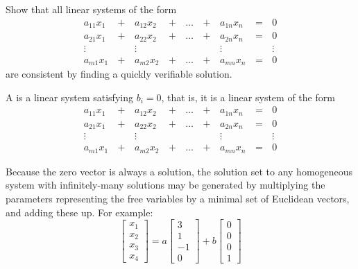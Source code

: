 \begin{applicationActivities}{3}{5}
\begin{activity}{5}
  Show that all linear systems of the form
  \begin{alignat*}{5}
    a_{11}x_1 &\,+\,& a_{12}x_2 &\,+\,& \dots  &\,+\,& a_{1n}x_n &\,=\,& 0 \\
    a_{21}x_1 &\,+\,& a_{22}x_2 &\,+\,& \dots  &\,+\,& a_{2n}x_n &\,=\,& 0 \\
     \vdots&  &\vdots&   &&  &\vdots&&\vdots  \\
    a_{m1}x_1 &\,+\,& a_{m2}x_2 &\,+\,& \dots  &\,+\,& a_{mn}x_n &\,=\,& 0
  \end{alignat*}
  are consistent by finding a
  quickly verifiable solution.
\end{activity}

\begin{definition}
  A  is a linear system satisfying \(b_i=0\), that is,
  it is a linear system of the form
  \begin{alignat*}{5}
    a_{11}x_1 &\,+\,& a_{12}x_2 &\,+\,& \dots  &\,+\,& a_{1n}x_n &\,=\,& 0 \\
    a_{21}x_1 &\,+\,& a_{22}x_2 &\,+\,& \dots  &\,+\,& a_{2n}x_n &\,=\,& 0 \\
     \vdots&  &\vdots&   &&  &\vdots&&\vdots  \\
    a_{m1}x_1 &\,+\,& a_{m2}x_2 &\,+\,& \dots  &\,+\,& a_{mn}x_n &\,=\,& 0
  \end{alignat*}
\end{definition}

\begin{fact}
  Because the zero vector is always a solution,
  the solution set to any homogeneous system with infinitely-many solutions
  may be generated by multiplying the parameters representing the free variables
  by a minimal set of Euclidean vectors, and adding these up. For example:
  \[
    \begin{bmatrix}
      x_1 \\
      x_2 \\
      x_3 \\
      x_4
    \end{bmatrix}=
    a\begin{bmatrix}
      3 \\
      1 \\
      -1 \\
      0
    \end{bmatrix}+
    b\begin{bmatrix}
      0 \\
      0 \\
      0 \\
      1
    \end{bmatrix}
  \]
\end{fact}


\end{applicationActivities}
